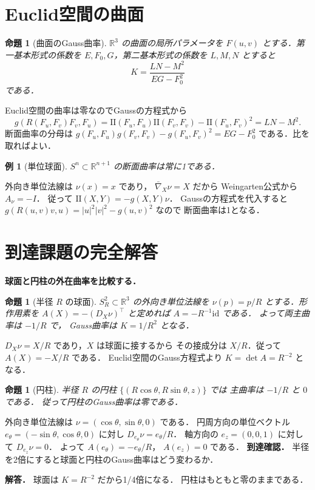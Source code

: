 \documentclass[a5paper,10pt,onecolumn]{jsarticle}
\makeatletter
\theoremstyle{mathnotetheorem}
\newtheorem{proposition}[theorem]{命題}
\newtheorem{example}[theorem]{例}
\renewcommand{\proofname}{証明}
\renewenvironment{proof}[1][\proofname]{%
  \par\pushQED{\qed}\normalfont\topsep4\p@\@plus2\p@\relax
  \trivlist\item[\hskip\labelsep\bfseries #1]\ignorespaces
}{\popQED\endtrivlist\@endpefalse}
\makeatother
\begin{document}
\section{Euclid空間の曲面}
\begin{proposition}[曲面のGauss曲率]
$\mathbb R^3$ の曲面の局所パラメータを
$F(u,v)$ とする．第一基本形式の係数を
$E,F_0,G$，第二基本形式の係数を $L,M,N$ とすると
\[
 K=\frac{LN-M^2}{EG-F_0^2}
\]
である．
\end{proposition}
\begin{proof}
Euclid空間の曲率は零なのでGaussの方程式から
\[
 g(R(F_u,F_v)F_v,F_u)
 =\mathrm{II}(F_u,F_u)\mathrm{II}(F_v,F_v)
 -\mathrm{II}(F_u,F_v)^2=LN-M^2.
\]
断面曲率の分母は
$g(F_u,F_u)g(F_v,F_v)-g(F_u,F_v)^2=EG-F_0^2$
である．比を取ればよい．
\end{proof}
\begin{example}[単位球面]
$S^n\subset\mathbb R^{n+1}$ の断面曲率は常に1である．
\end{example}
\begin{proof}
外向き単位法線は $\nu(x)=x$ であり，
$\bar\nabla_X\nu=X$ だから
Weingarten公式から $A_\nu=-I$．
従って
$\mathrm{II}(X,Y)=-g(X,Y)\nu$．
Gaussの方程式を代入すると
$g(R(u,v)v,u)=|u|^2|v|^2-g(u,v)^2$ なので
断面曲率は1となる．
\end{proof}

\section{到達課題の完全解答}
\noindent\textbf{球面と円柱の外在曲率を比較する．}
\begin{proposition}[半径 $R$ の球面]
$S_R^2\subset\mathbb R^3$ の外向き単位法線を
$\nu(p)=p/R$ とする．形作用素を
$A(X)=-(D_X\nu)^\top$ と定めれば
$A=-R^{-1}\mathrm{id}$ である．
よって両主曲率は $-1/R$ で，
Gauss曲率は $K=1/R^2$ となる．
\end{proposition}
\begin{proof}
$D_X\nu=X/R$ であり，$X$ は球面に接するから
その接成分は $X/R$．従って $A(X)=-X/R$ である．
Euclid空間のGauss方程式より
$K=\det A=R^{-2}$ となる．
\end{proof}
\begin{proposition}[円柱]
半径 $R$ の円柱
$\{(R\cos\theta,R\sin\theta,z)\}$ では
主曲率は $-1/R$ と $0$ である．
従って円柱のGauss曲率は零である．
\end{proposition}
\begin{proof}
外向き単位法線は
$\nu=(\cos\theta,\sin\theta,0)$ である．
円周方向の単位ベクトル
$e_\theta=(-\sin\theta,\cos\theta,0)$ に対し
$D_{e_\theta}\nu=e_\theta/R$．
軸方向の $e_z=(0,0,1)$ に対して
$D_{e_z}\nu=0$．
よって $A(e_\theta)=-e_\theta/R$，
$A(e_z)=0$ である．
\end{proof}
\noindent\textbf{到達確認．}
半径を2倍にすると球面と円柱のGauss曲率はどう変わるか．
\par\noindent\textbf{解答．}
球面は $K=R^{-2}$ だから1/4倍になる．
円柱はもともと零のままである．
\end{document}
